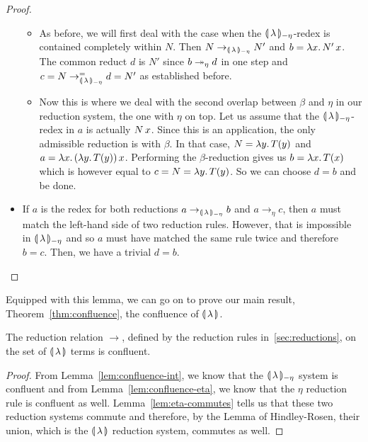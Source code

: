 \begin{proof}
\begin{itemize}
\begin{itemize}
    \item As before, we will first deal with the case when the
      ${\llparenthesis \, \lambda \, \rrparenthesis_{-\eta}}$-redex is contained completely within $N$. Then
      $N \to_{{\llparenthesis \, \lambda \, \rrparenthesis_{-\eta}}} N'$ and $b = \lambda x.\, N'\,x$. The common
      reduct $d$ is $N'$ since $b \twoheadrightarrow_\eta d$ in one step and
      $c = N \to_{{\llparenthesis \, \lambda \, \rrparenthesis_{-\eta}}}^= d = N'$ as established before.
    \item Now this is where we deal with the second overlap between $\beta$
      and $\eta$ in our reduction system, the one with $\eta$ on top. Let
      us assume that the ${\llparenthesis \, \lambda \, \rrparenthesis_{-\eta}}$-redex in $a$ is actually
      $N\,x$. Since this is an application, the only admissible
      reduction is with $\beta$. In that case, $N = \lambda y.\, T(y)$ and
      $a = \lambda x.\, (\lambda y.\, T(y))\,x$. Performing the
      $\beta$-reduction gives us $b = \lambda x.\, T(x)$ which is however equal
      to $c = N = \lambda y.\, T(y)$. So we can choose $d = b$ and be done.
    \end{itemize}
  \item If $a$ is the redex for both reductions $a \to_{{\llparenthesis \, \lambda \, \rrparenthesis_{-\eta}}} b$ and
    $a \to_\eta c$, then $a$ must match the left-hand side of two reduction
    rules. However, that is impossible in ${\llparenthesis \, \lambda \, \rrparenthesis_{-\eta}}$ and so $a$ must have
    matched the same rule twice and therefore $b = c$. Then, we have a
    trivial $d = b$.
  \end{itemize}
\end{proof}

Equipped with this lemma, we can go on to prove our main result,
Theorem~\ref{thm:confluence}, the confluence of $\llparenthesis \, \lambda \, \rrparenthesis$.

\begin{theorem}\label{thm:confluence}
  
  The reduction relation $\to$, defined by the reduction rules
  in~\ref{sec:reductions}, on the set of $\llparenthesis \, \lambda \, \rrparenthesis$ terms is
  confluent.
\end{theorem}

\begin{proof}
  From Lemma~\ref{lem:confluence-int}, we know that the
  $\llparenthesis \, \lambda \, \rrparenthesis_{-\eta}$ system is confluent and from
  Lemma~\ref{lem:confluence-eta}, we know that the $\eta$ reduction rule is
  confluent as well. Lemma~\ref{lem:eta-commutes} tells us that these two
  reduction systems commute and therefore, by the Lemma of Hindley-Rosen,
  their union, which is the $\llparenthesis \, \lambda \, \rrparenthesis$ reduction system, commutes
  as well.
\end{proof}


